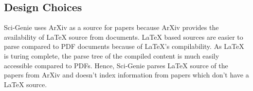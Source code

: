 \subsection{Design Choices}
Sci-Genie uses ArXiv as a source for papers because ArXiv provides the availability of LaTeX source from documents. LaTeX based sources are easier to parse compared to PDF documents because of LaTeX's compilability. As LaTeX is turing complete, the parse tree of the compiled content is much easily accessible compared to PDFs. Hence, Sci-Genie parses LaTeX source of the papers from ArXiv and doesn't index information from papers which don't have a LaTeX source. 